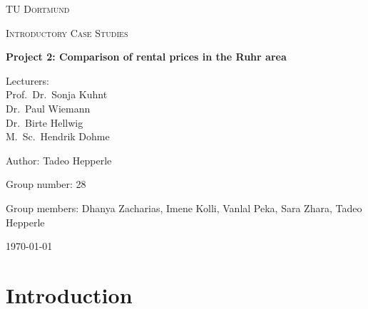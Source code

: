 \documentclass[12 pt]{scrartcl}
\begin{document}
\begin{titlepage}
  \centering
  {\scshape\LARGE TU Dortmund \par}
  \vspace{1cm}
  {\scshape\Large Introductory Case Studies \par}
  \vspace{2cm}
  {\huge\bfseries Project 2: Comparison of rental prices in the Ruhr area\par}
  \vspace{2cm}
  {\Large Lecturers:\\
    Prof.\ Dr.\ Sonja Kuhnt\\
    Dr.\ Paul Wiemann\\
    Dr.\ Birte Hellwig\\
    M.\ Sc.\ Hendrik Dohme \par}
  \vspace{1cm}
  {\Large Author: Tadeo Hepperle \par}
  \vspace{0.5 cm}
  {\Large Group number: 28\par}
  \vspace{0.5 cm}
  {\Large Group members: Dhanya Zacharias, Imene Kolli, Vanlal Peka, Sara Zhara, Tadeo Hepperle}
  \vfill
  {\large \today\par}
\end{titlepage}


\tableofcontents

\cleardoublepage

\section{Introduction}
\end{document}
